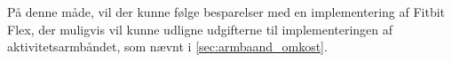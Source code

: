 På denne måde, vil der kunne følge besparelser med en implementering af Fitbit Flex, der muligvis vil kunne udligne udgifterne til implementeringen af aktivitetsarmbåndet, som nævnt i \autoref{sec:armbaand_omkost}. 


